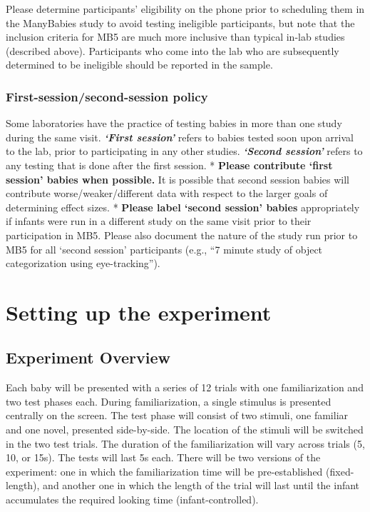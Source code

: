 \documentclass[
]{book}
\begin{document}
Please determine participants' eligibility on the phone prior to scheduling them in the ManyBabies study to avoid testing ineligible participants, but note that the inclusion criteria for MB5 are much more inclusive than typical in-lab studies (described above). Participants who come into the lab who are subsequently determined to be ineligible should be reported in the sample.

\hypertarget{first-sessionsecond-session-policy}{%
\subsection{First-session/second-session policy}\label{first-sessionsecond-session-policy}}

Some laboratories have the practice of testing babies in more than one study during the same visit. \textbf{\emph{`First session'}} refers to babies tested soon upon arrival to the lab, prior to participating in any other studies. \textbf{\emph{`Second session'}} refers to any testing that is done after the first session.
* \textbf{Please contribute `first session' babies when possible.} It is possible that second session babies will contribute worse/weaker/different data with respect to the larger goals of determining effect sizes.
* \textbf{Please label `second session' babies} appropriately if infants were run in a different study on the same visit prior to their participation in MB5. Please also document the nature of the study run prior to MB5 for all `second session' participants (e.g., ``7 minute study of object categorization using eye-tracking'').

\hypertarget{setting-up-the-experiment}{%
\chapter{Setting up the experiment}\label{setting-up-the-experiment}}

\hypertarget{experiment-overview}{%
\section{Experiment Overview}\label{experiment-overview}}

Each baby will be presented with a series of 12 trials with one familiarization and two test phases each. During familiarization, a single stimulus is presented centrally on the screen. The test phase will consist of two stimuli, one familiar and one novel, presented side-by-side. The location of the stimuli will be switched in the two test trials. The duration of the familiarization will vary across trials (5, 10, or 15s). The tests will last 5s each. There will be two versions of the experiment: one in which the familiarization time will be pre-established (fixed-length), and another one in which the length of the trial will last until the infant accumulates the required looking time (infant-controlled).
\end{document}
